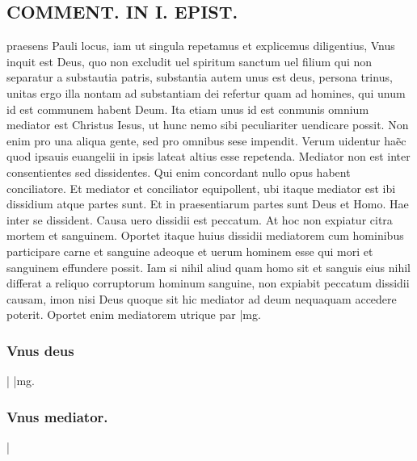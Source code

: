 \documentclass{article}
\begin{document}
\begin{pages}
\section*{COMMENT. IN I. EPIST. }\pstart praesens Pauli locus, iam ut singula repetamus et explicemus diligentius, Vnus inquit est Deus, quo non excludit uel spiritum sanctum uel filium qui non separatur a substautia patris, substantia autem unus est deus, persona trinus, unitas ergo illa nontam ad substantiam dei refertur quam ad homines, qui unum id est communem habent Deum. Ita etiam unus id est conmunis omnium mediator est Christus Iesus, ut hunc nemo sibi peculiariter uendicare possit. Non enim pro una aliqua gente, sed pro omnibus sese impendit. Verum uidentur haẽc quod ipsauis euangelii in ipsis lateat altius esse repetenda. Mediator non est inter consentientes sed dissidentes. Qui enim concordant nullo opus habent conciliatore. Et mediator et conciliator equipollent, ubi itaque mediator est ibi dissidium atque partes sunt. Et in praesentiarum partes sunt Deus et Homo. Hae inter se dissident. Causa uero dissidii est peccatum. At hoc non expiatur citra mortem et sanguinem. Oportet itaque huius dissidii mediatorem cum hominibus participare carne et sanguine adeoque et uerum hominem esse qui mori et sanguinem effundere possit. Iam si nihil aliud quam homo sit et sanguis eius nihil differat a reliquo corruptorum hominum sanguine, non expiabit peccatum dissidii causam, imon nisi Deus quoque sit hic mediator ad deum nequaquam accedere poterit. Oportet enim mediatorem utrique par\pend
|mg. \subsubsection*{Vnus deus }|
|mg. \subsubsection*{Vnus mediator. }|

\end{pages}
\end{document}
